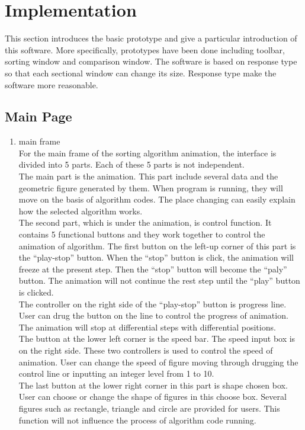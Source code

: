 \documentclass[paper=a4, fontsize=11pt,twoside]{scrartcl}		%
\begin{document}
\section{Implementation}

This section introduces the basic prototype and give a particular introduction of this software. More specifically, prototypes have been done including toolbar, sorting window and comparison window. The software is based on response type so that each sectional window can change its size. Response type make the software more reasonable.

\subsection{Main Page}
\begin{enumerate}

\item main frame\\
For the main frame of the sorting algorithm animation, the interface is divided into 5 parts. Each of these 5 parts is not independent. \\
    The main part is the animation. This part include several data and the geometric figure generated by them. When program is running, they will move on the basis of algorithm codes. The place changing can easily explain how the selected algorithm works. \\
    The second part, which is under the animation, is control function. It contains 5 functional buttons and they work together to control the animation of algorithm. The first button on the left-up corner of this part is the “play-stop” button. When the “stop” button is click, the animation will freeze at the present step. Then the “stop” button will become the “paly” button. The animation will not continue the rest step until the “play” button is clicked. \\
    The controller on the right side of the “play-stop” button is progress line. User can drug the button on the line to control the progress of animation. The animation will stop at differential steps with differential positions. \\
    The button at the lower left corner is the speed bar. The speed input box is on the right side. These two controllers is used to control the speed of animation. User can change the speed of figure moving through drugging the control line or inputting an integer level from 1 to 10. \\
    The last button at the lower right corner in this part is shape chosen box. User can choose or change the shape of figures in this choose box. Several figures such as rectangle, triangle and circle are provided for users. This function will not influence the process of algorithm code running. \\



\end{enumerate}
\end{document}
